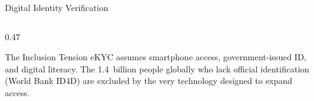 \begin{frame}{Digital Identity Verification}
\begin{columns}[T]
\begin{column}{0.47\textwidth}
      \vspace{0.3em}
      \begin{alertblock}{The Inclusion Tension}
        eKYC assumes smartphone access, government-issued ID, and digital
        literacy. The \textcolor{mlred}{1.4~billion people} globally who lack
        official identification (World Bank ID4D) are excluded by the very
        technology designed to expand access.
      \end{alertblock}
    \end{column}
  \end{columns}
\end{frame}

